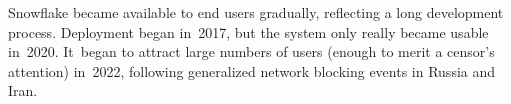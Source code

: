 \documentclass[letterpaper,twocolumn]{article}
\begin{document}

Snowflake became available to end users gradually,
reflecting a long development process.
Deployment began in~2017,
but the system only really became usable in~2020.
It~began to attract large numbers of users
(enough to merit a censor's attention)
in~2022, following generalized
network blocking events in Russia and Iran.
\end{document}
